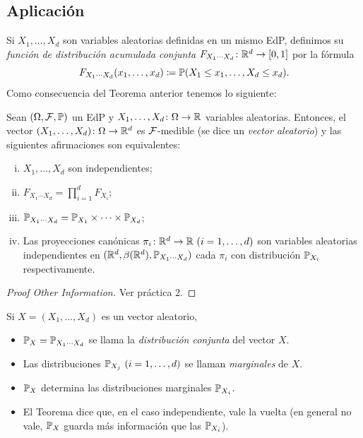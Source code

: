\subsection{Aplicación}
Si $X_{1},\dots,X_{d}$ son variables aleatorias definidas en un mismo EdP, definimos su \textit{función de distribución acumulada conjunta} $F_{X_{1}\cdots X_{d}} \colon \mathbb{R}^{d} \to [0,1]$ por la fórmula
\[ F_{X_{1} \cdots X_{d}}(x_{1},\dots,x_{d}) \coloneq \mathbb{P}(X_{1} \leq x_{1},\dots, X_{d} \leq x_{d}). \]
Como consecuencia del Teorema anterior tenemos lo siguiente:

\begin{theorem}
	Sean $(\Omega, \mathcal{F}, \mathbb{P})$ un EdP y $X_{1},\dots,X_{d} \colon \Omega \to \mathbb{R}$ variables aleatorias. Entonces, el vector $(X_{1}, \dots, X_{d}) \colon \Omega \to \mathbb{R}^{d}$ es $\mathcal{F}$-medible (se dice un \textit{vector aleatorio}) y las siguientes afirmaciones son equivalentes:
	\begin{enumerate}[i)]
		\item $X_{1}, \dots, X_{d}$ son independientes;

		\item $F_{X_{1} \cdots X_{d}} = \prod_{i=1}^{d} F_{X_{i}}$;

		\item $\mathbb{P}_{X_{1} \cdots X_{d}} = \mathbb{P}_{X_{1}} \times \cdots \times \mathbb{P}_{X_{d}}$;

		\item Las proyecciones canónicas $\pi_{i} \colon \mathbb{R}^{d} \to \mathbb{R} \ (i = 1,\dots,d)$ son variables aleatorias independientes en $(\mathbb{R}^{d}, \beta(\mathbb{R}^{d}), \mathbb{P}_{X_{1} \cdots X_{d}})$ cada $\pi_{i}$ con distribución $\mathbb{P}_{X_{i}}$ respectivamente.
	\end{enumerate}
\end{theorem}
\begin{proof}[Proof Other Information]
	Ver práctica 2.
\end{proof}

\begin{note}
	Si $X = (X_{1},\dots,X_{d})$ es un vector aleatorio,
	\begin{itemize}
		\item $\mathbb{P}_{X} = \mathbb{P}_{X_{1} \cdots X_{d}}$ se llama la \textit{distribución conjunta} del vector $X$.

		\item Las distribuciones $\mbb{P}_{X_{j}} \ (i = 1,\dots,d)$ se llaman \textit{marginales} de $X$.
	\end{itemize}

	\begin{itemize}
		\item[$\rightarrow$] $\mathbb{P}_{X}$ determina las distribuciones marginales $\mathbb{P}_{X_{i}}$.

		\item[$\rightarrow$] El Teorema dice que, en el caso independiente, vale la vuelta (en general no vale, $\mathbb{P}_{X}$ guarda más información que las $\mathbb{P}_{X_{i}}$).
	\end{itemize}
 \end{note}

